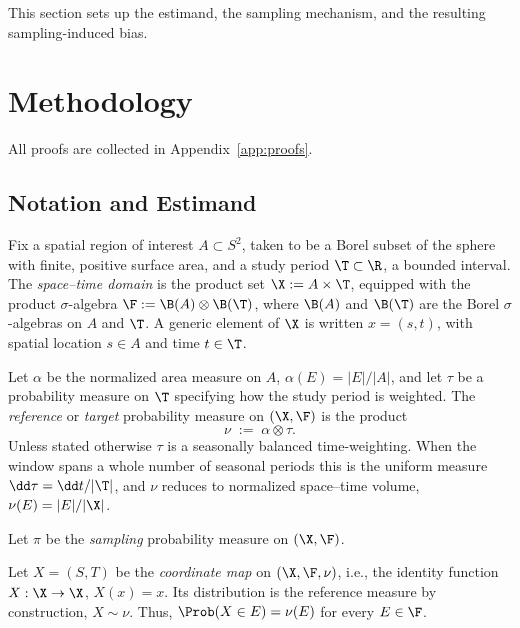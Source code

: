 This section sets up the estimand, the sampling mechanism, and the resulting sampling-induced bias.

\section{Methodology}
\label{sec:methodology}

All proofs are collected in Appendix~\ref{app:proofs}.

\subsection{Notation and Estimand}
\label{sec:def}

\begin{definition}
\label{def:domain}
Fix a spatial region of interest $A \subset S^{2}$, taken to be a Borel subset of the sphere with finite, positive surface area, and a study period $\T \subset \R$, a bounded interval.
The \emph{space--time domain} is the product set
$\X := A \times \T$, equipped with the product $\sigma$-algebra
$\F := \B(A)\otimes\B(\T)$, where $\B(A)$ and $\B(\T)$ are the Borel
$\sigma$-algebras on $A$ and $\T$. A generic element of $\X$ is written
$x = (s,t)$, with spatial location $s \in A$ and time $t \in \T$.
\end{definition}

\begin{definition}
\label{def:nu}
Let $\alpha$ be the normalized area measure on $A$, $\alpha(E)=|E|/|A|$,
and let $\tau$ be a probability measure on $\T$ specifying how the study
period is weighted. The \emph{reference} or \emph{target} probability
measure on $(\X,\F)$ is the product
\[
  \nu \;:=\; \alpha\otimes\tau .
\]
Unless stated otherwise $\tau$ is a seasonally balanced time-weighting.
When the window spans a whole number
of seasonal periods this is the uniform measure $\dd\tau=\dd t/|\T|$, and
$\nu$ reduces to normalized space--time volume, $\nu(E)=|E|/|\X|$.
\end{definition}

\begin{definition}
\label{def:pi}
Let $\pi$ be the \emph{sampling} probability measure on $(\X,\F)$.
\end{definition}


\begin{definition}
\label{def:X}
Let $X = (S,T)$ be the \emph{coordinate map} on $(\X,\F,\nu)$, i.e., the identity function $X : \X \to \X$, $X(x) = x$.
Its distribution is the reference measure by construction, $X \sim \nu$.
Thus, $\Prob(X \in E) = \nu(E)$ for every $E \in \F$. 
\end{definition}

